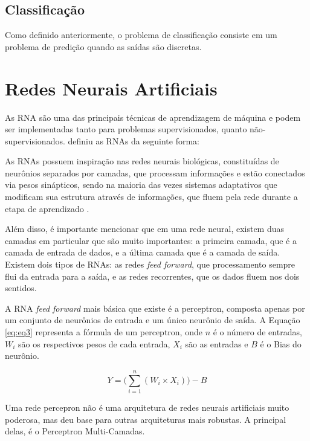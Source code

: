 \subsection{Classificação}
\label{subsecao:2:1:2}

Como definido anteriormente, o problema de classificação consiste em um problema de predição quando as saídas são discretas.

\section{Redes Neurais Artificiais}
\label{secao:2:2}

As \ac{RNA} são uma das principais técnicas de aprendizagem de máquina e podem ser implementadas tanto para problemas supervisionados, quanto não-supervisionados.  definiu as \ac{RNA}s da seguinte forma:

\begin{citacao}
	As \ac{RNA}s possuem inspiração nas redes neurais biológicas, constituídas de neurônios separados por camadas, que processam informações e estão conectados via pesos sinápticos, sendo na maioria das vezes sistemas adaptativos que modificam sua estrutura através de informações, que fluem pela rede durante a etapa de aprendizado \cite{jost-2015}.
\end{citacao}

Além disso, é importante mencionar que em uma rede neural, existem duas camadas em particular que são muito importantes: a primeira camada, que é a camada de entrada de dados, e a última camada que é a camada de saída. Existem dois tipos de \ac{RNA}s: as redes \textit{feed forward}, que processamento sempre flui da entrada para a saída, e as redes recorrentes, que os dados fluem nos dois sentidos.

A \ac{RNA} \textit{feed forward} mais básica que existe é a perceptron, composta apenas por um conjunto de neurônios de entrada e um único neurônio de saída. A Equação \ref{eq:eq3} representa a fórmula de um perceptron, onde $n$ é o número de entradas, $W_i$ são os respectivos pesos de cada entrada, $X_i$ são as entradas e $B$ é o Bias do neurônio.

\begin{equation}
Y=\Big(\sum_{i=1}^{n}{(W_i \times X_i)}\Big) - B
\label{eq:eq3}
\end{equation}

Uma rede percepron não é uma arquitetura de redes neurais artificiais muito poderosa, mas deu base para outras arquiteturas mais robustas. A principal delas, é o Perceptron Multi-Camadas.

